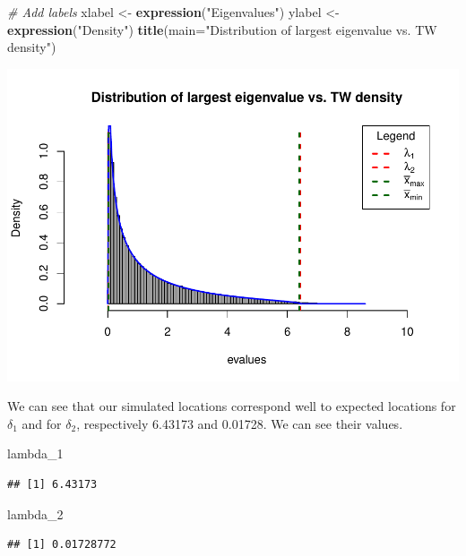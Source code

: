 \documentclass[
]{article}
\newenvironment{Shaded}{\begin{snugshade}}{\end{snugshade}}
\newcommand{\AttributeTok}[1]{\textcolor[rgb]{0.13,0.29,0.53}{#1}}
\newcommand{\CommentTok}[1]{\textcolor[rgb]{0.56,0.35,0.01}{\textit{#1}}}
\newcommand{\FunctionTok}[1]{\textcolor[rgb]{0.13,0.29,0.53}{\textbf{#1}}}
\newcommand{\NormalTok}[1]{#1}
\newcommand{\OtherTok}[1]{\textcolor[rgb]{0.56,0.35,0.01}{#1}}
\newcommand{\StringTok}[1]{\textcolor[rgb]{0.31,0.60,0.02}{#1}}
\begin{document}
\begin{Shaded}
\begin{Highlighting}[]
\CommentTok{\# Add labels}
\NormalTok{xlabel }\OtherTok{\textless{}{-}} \FunctionTok{expression}\NormalTok{(}\StringTok{"Eigenvalues"}\NormalTok{)}
\NormalTok{ylabel }\OtherTok{\textless{}{-}} \FunctionTok{expression}\NormalTok{(}\StringTok{"Density"}\NormalTok{)}
\FunctionTok{title}\NormalTok{(}\AttributeTok{main=}\StringTok{"Distribution of largest eigenvalue vs. TW density"}\NormalTok{)}
\end{Highlighting}
\end{Shaded}

\includegraphics{A5_files/figure-latex/unnamed-chunk-9-1.pdf}

We can see that our simulated locations correspond well to expected
locations for \(\delta_1\) and for \(\delta_2\), respectively 6.43173
and 0.01728. We can see their values.

\begin{Shaded}
\begin{Highlighting}[]
\NormalTok{lambda\_1}
\end{Highlighting}
\end{Shaded}

\begin{verbatim}
## [1] 6.43173
\end{verbatim}

\begin{Shaded}
\begin{Highlighting}[]
\NormalTok{lambda\_2}
\end{Highlighting}
\end{Shaded}

\begin{verbatim}
## [1] 0.01728772
\end{verbatim}
\end{document}
